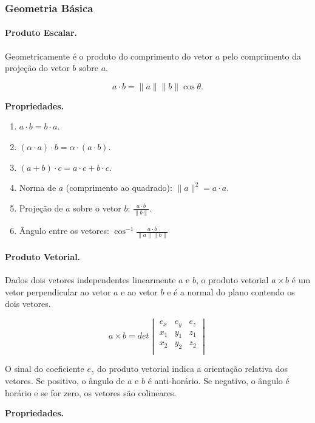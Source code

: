 \subsubsection{Geometria Básica}
\paragraph{Produto Escalar.}
Geometricamente é o produto do comprimento do vetor $a$ pelo comprimento da projeção do vetor $b$ sobre $a$.

$$a \cdot b = \|a\|\|b\|\cos\theta.$$

\textbf{Propriedades.}

\begin{multicols}{2}
	\begin{enumerate}
		\item $a \cdot b = b \cdot a$.
		\item $(\alpha \cdot a) \cdot b = \alpha\cdot(a \cdot b)$.
		\item $(a+b)\cdot c = a\cdot c + b \cdot c$.
		\item Norma de $a$ (comprimento ao quadrado): $\|a\|^2 = a \cdot a$.
		\item Projeção de $a$ sobre o vetor $b$: $\frac{a \cdot b}{\|b\|}$.
		\item Ângulo entre os vetores: $\cos^{-1}{\frac{a \cdot b}{\|a\|\|b\|}}$
	\end{enumerate}
\end{multicols}

\paragraph{Produto Vetorial.}
Dados dois vetores independentes linearmente $a$ e $b$, o produto vetorial $a \times b$ é um vetor perpendicular ao vetor $a$ e ao vetor $b$ e é a normal do plano contendo os dois vetores.

$$a \times b = det
	\begin{vmatrix}
		e_x & e_y & e_z \\
		x_1 & y_1 & z_1 \\
		x_2 & y_2 & z_2 \\
	\end{vmatrix}
$$

O sinal do coeficiente $e_z$ do produto vetorial indica a orientação relativa dos vetores. Se positivo, o ângulo de $a$ e $b$ é anti-horário. Se negativo, o ângulo é horário e se for zero, os vetores são colineares.

\textbf{Propriedades.} 

